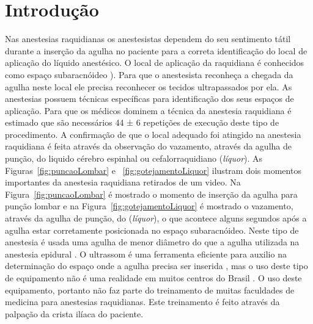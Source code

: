 



\chapter{Introdução}
\label{cap:introducao}

Nas anestesias raquidianas os anestesistas dependem do seu sentimento tátil durante a inserção da agulha no paciente para a correta identificação do local de aplicação do líquido anestésico. O local de aplicação da raquidiana é conhecidos como espaço subaracnóideo \cite{Miller2009}). Para que o anestesista reconheça a chegada da agulha neste local ele precisa reconhecer os tecidos ultrapassados por ela. As anestesias possuem técnicas específicas para identificação dos seus espaços de aplicação. Para que os médicos dominem a técnica da anestesia raquidiana é estimado que são necessários 44 ± 6 repetições de execução deste tipo de procedimento. A confirmação de que o local adequado foi atingido na anestesia raquidiana é feita através da observação do vazamento, através da agulha de punção, do liquido cérebro espinhal ou cefalorraquidiano (\textit{líquor}). As Figuras~\ref{fig:puncaoLombar} e ~\ref{fig:gotejamentoLiquor}  ilustram dois momentos importantes da anestesia raquidiana retirados de um video. Na Figura~\ref{fig:puncaoLombar} é mostrado o momento de inserção da agulha para punção lombar e na Figura~\ref{fig:gotejamentoLiquor} é mostrado o vazamento, através da agulha de punção, do (\textit{líquor}), o que acontece alguns segundos após a agulha estar corretamente posicionada no espaço subaracnóideo. Neste tipo de anestesia é usada uma agulha de menor diâmetro do que a agulha utilizada na anestesia epidural \cite{Miller2009}. O ultrassom é uma ferramenta eficiente para auxilio na determinação do espaço onde a agulha precisa ser inserida \cite{Helayel2010}, mas o uso deste tipo de equipamento não é uma realidade em muitos centros do Brasil \cite{Hamaji2016}. O uso deste equipamento, portanto não faz parte do treinamento de muitas faculdades de medicina para anestesias raquidianas. Este treinamento é feito através da palpação da crista ilíaca do paciente.



